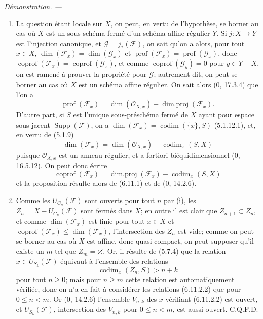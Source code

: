 \documentclass[10pt,oneside]{book}
\newcommand{\oldpage}[2][]{%
  \setcounter{footnote}{0}%
  \marginpar{\scriptsize\textbf{#1}~|~#2}\ignorespaces}
\newenvironment{proof}{%
  \par\medskip\noindent\textit{Démonstration. ---\ }}{\par}
\begin{document}
\begin{proof}
\begin{enumerate}
\item[(i)] La question étant locale sur $X$, on peut, en vertu de
l'hypothèse, se borner au cas où $X$ est un sous-schéma fermé d'un schéma
affine régulier $Y$. Si $j:X\to Y$ est l'injection canonique, et
$\mathcal G=j_*(\mathcal F)$, on sait qu'on a alors, pour tout $x\in X$,
$\dim(\mathcal F_x)=\dim(\mathcal G_x)$ et
$\operatorname{prof}(\mathcal F_x)=\operatorname{prof}(\mathcal G_x)$,
donc $\operatorname{coprof}(\mathcal F_x)=
\operatorname{coprof}(\mathcal G_x)$, et comme
$\operatorname{coprof}(\mathcal G_y)=0$ pour $y\in Y-X$, on est ramené à
prouver la propriété pour $\mathcal G$; autrement dit, on peut se borner au
cas où $X$ est un schéma affine régulier. On sait alors (0, 17.3.4) que
l'on a
\[
\operatorname{prof}(\mathcal F_x)=\dim(\mathcal O_{X,x})-
\operatorname{dim.proj}(\mathcal F_x).
\]
D'autre part, si $S$ est l'unique sous-préschéma fermé de $X$ ayant pour
espace sous-jacent $\operatorname{Supp}(\mathcal F)$, on a
$\dim(\mathcal F_x)=\operatorname{codim}(\{x\},S)$ (5.1.12.1), et, en
vertu de (5.1.9)
\[
\dim(\mathcal F_x)=\dim(\mathcal O_{X,x})-\operatorname{codim}_x(S,X)
\]
puisque $\mathcal O_{X,x}$ est un anneau régulier, et a fortiori
biéquidimensionnel (0, 16.5.12). On peut donc écrire
\begin{equation}
\operatorname{coprof}(\mathcal F_x)=
\operatorname{dim.proj}(\mathcal F_x)-\operatorname{codim}_x(S,X)
\tag{6.11.2.1}\label{IV.2.s6.11.2.1-fr}
\end{equation}
et la proposition résulte alors de (6.11.1) et de (0, 14.2.6).

\oldpage[IV-2]{160}

\item[(ii)] Comme les $U_{C_n}(\mathcal F)$ sont ouverts pour tout $n$ par
(i), les $Z_n=X-U_{C_n}(\mathcal F)$ sont fermés dans $X$; en outre il est
clair que $Z_{n+1}\subset Z_n$, et comme $\dim(\mathcal F_x)$ est finie
pour tout $x\in X$ et
$\operatorname{coprof}(\mathcal F_x)\leq\dim(\mathcal F_x)$,
l'intersection des $Z_n$ est vide; comme on peut se borner au cas où $X$
est affine, donc quasi-compact, on peut supposer qu'il existe un $m$ tel
que $Z_m=\varnothing$. Or, il résulte de (5.7.4) que la relation
$x\in U_{S_k}(\mathcal F)$ équivaut à l'ensemble des relations
\begin{equation}
\operatorname{codim}_x(Z_n,S)>n+k
\tag{6.11.2.2}\label{IV.2.s6.11.2.2-fr}
\end{equation}
pour tout $n\geq0$; mais pour $n\geq m$ cette relation est automatiquement
vérifiée, donc on n'a en fait à considérer les relations (6.11.2.2) que
pour $0\leq n<m$. Or (0, 14.2.6) l'ensemble $V_{n,k}$ des $x$ vérifiant
(6.11.2.2) est ouvert, et $U_{S_k}(\mathcal F)$, intersection des $V_{n,k}$
pour $0\leq n<m$, est aussi ouvert. C.Q.F.D.
\end{enumerate}
\end{proof}
\end{document}
